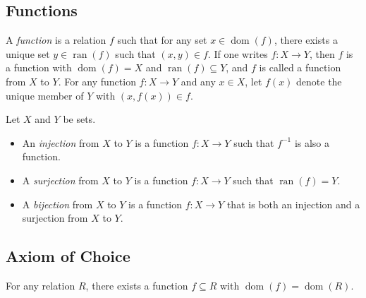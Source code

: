 \documentclass[11pt]{article}
\DeclareMathOperator{\dom}{dom}
\DeclareMathOperator{\ran}{ran}
\begin{document}
\subsection{Functions}
\begin{definition}
  A \emph{function} is a relation $f$ such that for any set $x \in \dom(f)$, there exists a unique set $y \in \ran(f)$ such that $(x, y) \in f$.
  If one writes $f: X \to Y$, then $f$ is a function with $\dom(f) = X$ and $\ran(f) \subseteq Y$, and $f$ is called a function from $X$ to $Y$.
  For any function $f: X \to Y$ and any $x \in X$, let $f(x)$ denote the unique member of $Y$ with $(x, f(x)) \in f$.
\end{definition}

\begin{definition}
  Let $X$ and $Y$ be sets.
  \begin{itemize}
    \item An \emph{injection} from $X$ to $Y$ is a function $f: X \to Y$ such that $f^{-1}$ is also a function.
    \item A \emph{surjection} from $X$ to $Y$ is a function $f: X \to Y$ such that $\ran(f) = Y$.
    \item A \emph{bijection} from $X$ to $Y$ is a function $f: X \to Y$ that is both an injection and a surjection from $X$ to $Y$.
  \end{itemize}
\end{definition}

\subsection{Axiom of Choice}
\begin{axiom}[Choice]
  For any relation $R$, there exists a function $f \subseteq R$ with $\dom(f) = \dom(R)$.
\end{axiom}
\end{document}
